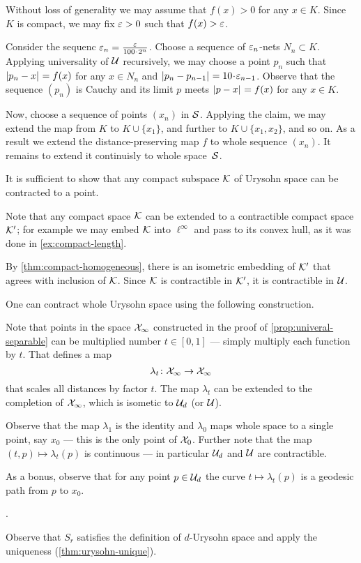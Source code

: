 Without loss of generality we may assume that $f(x)>0$ for any $x\in K$.
Since $K$ is compact, we may fix $\varepsilon>0$ such that $f(x)>\varepsilon$.

Consider the sequenc $\eps_n=\tfrac\eps{100\cdot 2^n}$.
Choose a sequence of $\varepsilon_n$-nets $N_n\subset K$.
Applying universality of $\mathcal{U}$ recursively, we may choose a point $p_n$ such that $\dist{p_n}{x}{}=f(x)$ for any $x\in N_n$ and $\dist{p_n}{p_{n-1}}{}\z=10\cdot\eps_{n-1}$.
Observe that the sequence $(p_n)$ is Cauchy and its limit $p$ meets 
$\dist{p}{x}{}=f(x)$ for any $x\in K$.

Now, choose a sequence of points $(x_n)$ in $\mathcal{S}$.
Applying the claim, we may extend the map from $K$ to $K\cup\{x_1\}$, and further to $K\cup\{x_1,x_2\}$, and so on.
As a result we extend the distance-preserving map $f$ to whole sequence $(x_n)$.
It remains to extend it continuisly to whole space~$\mathcal{S}$.

It is sufficient to show that any compact subspace $\mathcal{K}$ of Urysohn space can be contracted to a point.

Note that any compact space $\mathcal{K}$ can be extended to a contractible compact space $\mathcal{K}'$; for example we may embed $\mathcal{K}$ into $\ell^\infty$ and pass to its convex hull, as it was done in \ref{ex:compact-length}.

By \ref{thm:compact-homogeneous}, there is an isometric embedding of $\mathcal{K}'$ that agrees with inclusion of $\mathcal{K}$.
Since $\mathcal{K}$ is contractible in $\mathcal{K}'$, it is contractible in $\mathcal{U}$.

One can contract whole Urysohn space using the following construction.

Note that points in the space $\mathcal{X}_\infty$ constructed in the proof of \ref{prop:univeral-separable} can be multiplied number $t\in [0,1]$ --- simply multiply each function by $t$.
That defines a map 
\[\lambda_t\colon\mathcal{X}_\infty\to \mathcal{X}_\infty\]
that scales all distances by factor $t$.
The map $\lambda_t$ can be extended to the completion of $\mathcal{X}_\infty$, which is isometic to $\mathcal{U}_d$ (or $\mathcal{U}$).

Observe that 
the map $\lambda_1$ is the identity  and $\lambda_0$ maps whole space to a single point, say $x_0$ --- this is the only point of $\mathcal{X}_0$.
Further note that the map $(t,p)\mapsto \lambda_t(p)$ is continuous ---  in particular $\mathcal{U}_d$ and $\mathcal{U}$ are contractible.

As a bonus, observe that for any point $p\in \mathcal{U}_d$ the curve $t\mapsto \lambda_t(p)$ is a geodesic path from $p$ to $x_0$.

 \cite[(d) on page 82]{gromov-2007}.

Observe that $S_r$ satisfies the definition of $d$-Urysohn space and apply the uniqueness (\ref{thm:urysohn-unique}).
